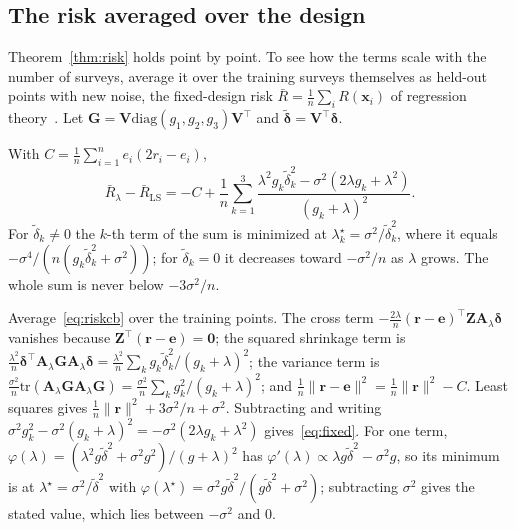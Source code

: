\subsection{The risk averaged over the design}

Theorem~\ref{thm:risk} holds point by point. To see how the terms scale with the number of surveys, average it over the
training surveys themselves as held-out points with new noise, the fixed-design risk $\bar R=\frac1n\sum_iR(\mathbf x_i)$ of
regression theory~\cite{hastie}. Let $\mathbf G=\mathbf V\mathrm{diag}(g_1,g_2,g_3)\mathbf V^{\top}$ and
$\tilde{\boldsymbol\delta}=\mathbf V^{\top}\boldsymbol\delta$.

\begin{theorem}\label{thm:fixed}
With $C=\frac1n\sum_{i=1}^n e_i(2r_i-e_i)$,
\begin{equation}
\bar R_\lambda-\bar R_{\mathrm{LS}}=-C+\frac1n\sum_{k=1}^{3}\frac{\lambda^2g_k\tilde\delta_k^2-\sigma^2(2\lambda g_k+\lambda^2)}{(g_k+\lambda)^2}.
\label{eq:fixed}
\end{equation}
For $\tilde\delta_k\ne0$ the $k$-th term of the sum is minimized at $\lambda_k^\star=\sigma^2/\tilde\delta_k^2$, where it equals
$-\sigma^4/(n(g_k\tilde\delta_k^2+\sigma^2))$; for $\tilde\delta_k=0$ it decreases toward $-\sigma^2/n$ as $\lambda$ grows. The
whole sum is never below $-3\sigma^2/n$.
\end{theorem}
\begin{IEEEproof}
Average~\eqref{eq:riskcb} over the training points. The cross term $-\frac{2\lambda}{n}(\mathbf r-\mathbf e)^{\top}\mathbf
Z\mathbf A_\lambda\boldsymbol\delta$ vanishes because $\mathbf Z^{\top}(\mathbf r-\mathbf e)=\mathbf 0$; the squared shrinkage
term is $\frac{\lambda^2}{n}\boldsymbol\delta^{\top}\mathbf A_\lambda\mathbf G\mathbf A_\lambda\boldsymbol\delta=\frac{\lambda^2}{n}\sum_kg_k\tilde\delta_k^2/(g_k+\lambda)^2$;
the variance term is $\frac{\sigma^2}{n}\mathrm{tr}(\mathbf A_\lambda\mathbf G\mathbf A_\lambda\mathbf G)=\frac{\sigma^2}{n}\sum_kg_k^2/(g_k+\lambda)^2$;
and $\frac1n\|\mathbf r-\mathbf e\|^2=\frac1n\|\mathbf r\|^2-C$. Least squares gives $\frac1n\|\mathbf r\|^2+3\sigma^2/n+\sigma^2$.
Subtracting and writing $\sigma^2g_k^2-\sigma^2(g_k+\lambda)^2=-\sigma^2(2\lambda g_k+\lambda^2)$ gives~\eqref{eq:fixed}. For one
term, $\varphi(\lambda)=(\lambda^2g\tilde\delta^2+\sigma^2g^2)/(g+\lambda)^2$ has $\varphi'(\lambda)\propto\lambda g\tilde\delta^2-\sigma^2g$,
so its minimum is at $\lambda^\star=\sigma^2/\tilde\delta^2$ with $\varphi(\lambda^\star)=\sigma^2g\tilde\delta^2/(g\tilde\delta^2+\sigma^2)$;
subtracting $\sigma^2$ gives the stated value, which lies between $-\sigma^2$ and $0$.
\end{IEEEproof}

